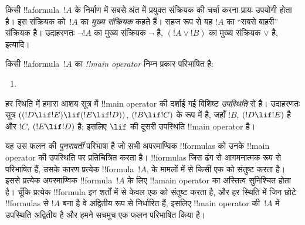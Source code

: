 \documentclass[../../../include/open-logic-section]{subfiles}
\begin{document}


\begin{explain}
किसी !!a{formula}~$!A$ के निर्माण में सबसे अंत में प्रयुक्त संक्रियक की
चर्चा करना प्रायः उपयोगी होता है। इस संक्रियक को~$!A$ का \emph{मुख्य
संक्रियक} कहते हैं। सहज रूप से यह $!A$ का ``सबसे बाहरी'' संक्रियक है।
उदाहरणतः $\lnot !A$ का मुख्य संक्रियक $\lnot$ है, $(!A \lor !B)$ का मुख्य
संक्रियक $\lor$ है, इत्यादि।
\end{explain}


\begin{defn}
किसी !!a{formula}~$!A$ का \emph{!!{main operator}} निम्न प्रकार परिभाषित है:
\begin{enumerate}
\item {}







\end{enumerate}
\end{defn}

हर स्थिति में हमारा आशय सूत्र में !!{main operator} की दर्शाई गई विशिष्ट
\emph{उपस्थिति} से है। उदाहरणतः सूत्र $((!D \lif !E) \lif (!E \lif !D))$,
$(!B \lif !C)$ के रूप में है, जहाँ $!B$, $(!D \lif !E)$ है और $!C$,
$(!E \lif !D)$ है; इसलिए $\lif$ की दूसरी उपस्थिति !!{main operator} है।

\begin{explain}
यह उस फलन की \emph{पुनरावर्ती} परिभाषा है जो सभी अपरमाण्विक !!{formula}s
को उनके !!{main operator} की उपस्थिति पर प्रतिचित्रित करता है। !!{formula}s
जिस ढंग से आगमनात्मक रूप से परिभाषित हैं, उसके कारण प्रत्येक
!!{formula}~$!A$,  के मामलों में से किसी एक को संतुष्ट
करता है। इससे प्रत्येक अपरमाण्विक !!{formula}~$!A$ के लिए !!a{main
  operator} का अस्तित्व सुनिश्चित होता है। चूँकि प्रत्येक !!{formula} इन
शर्तों में से केवल एक को संतुष्ट करता है, और हर स्थिति में जिन छोटे
!!{formula}s से $!A$ बना है वे अद्वितीय रूप से निर्धारित हैं, इसलिए
!!{main
  operator} की~$!A$ में उपस्थिति अद्वितीय है और हमने सचमुच एक फलन परिभाषित
किया है।
\end{explain}
\end{document}
